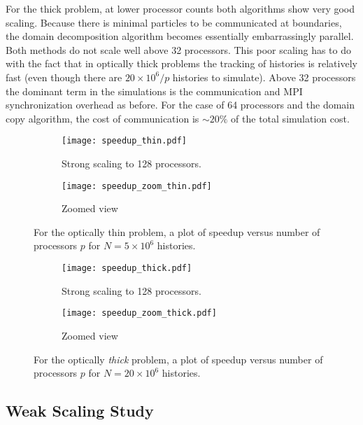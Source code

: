 \documentclass[12pt]{article}
\begin{document}
{{{For the thick problem, at lower processor counts both algorithms show very good
scaling. Because there is minimal particles to be communicated at boundaries, the domain decomposition
algorithm becomes essentially embarrassingly parallel.  Both methods do not scale
well above 32 processors. This poor scaling has to do with the fact that in optically
thick problems the tracking of histories is relatively fast (even though there are
$20\times 10^6/p$ histories to simulate).  Above 32 processors the dominant term in
the simulations is the communication and MPI synchronization overhead as before.  For the case of 64 processors and
the domain copy algorithm, the cost of communication is $\sim20 \%$ of the total
simulation cost.
     \begin{figure}[htbp!]
         \begin{subfigure}{0.5\textwidth}
         \centering
           \texttt{[image: speedup\_thin.pdf]}
           \caption{Strong scaling to 128 processors.}
     \end{subfigure}
     \begin{subfigure}{0.5\textwidth}
         \centering
           \texttt{[image: speedup\_zoom\_thin.pdf]}
           \caption{Zoomed view}
     \end{subfigure}
           \caption{For the optically thin problem, a plot of speedup versus number of processors $p$ for $N=5\times
               10^6$ histories.\label{thinsu}}
 \end{figure}
     \begin{figure}[htbp!]
         \begin{subfigure}{0.5\textwidth}
         \centering
           \texttt{[image: speedup\_thick.pdf]}
           \caption{Strong scaling to 128 processors.}
     \end{subfigure}
     \begin{subfigure}{0.5\textwidth}
         \centering
           \texttt{[image: speedup\_zoom\_thick.pdf]}
           \caption{Zoomed view}
     \end{subfigure}
     \caption{For the optically \emph{thick} problem, a plot of speedup versus number
            of processors $p$ for $N=20\times 10^6$ histories.\label{thicksu}} \end{figure}
  
\clearpage

\subsection{Weak Scaling Study}

}}}
\end{document}
